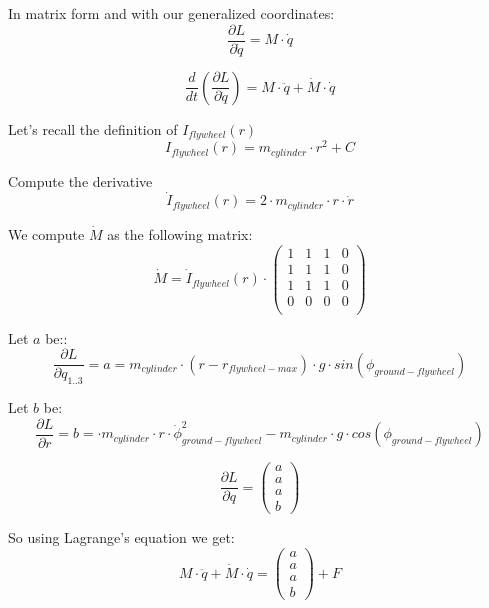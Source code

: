 In matrix form and with our generalized coordinates:
\begin{equation}
	\frac{\partial L}{\partial \dot{q}} =
	M \cdot \dot{q}
\end{equation}

\begin{equation}
	\frac{d}{dt}(\frac{\partial L}{\partial \dot{q}}) =
	M \cdot \ddot{q} + \dot{M} \cdot \dot{q}
\end{equation}

Let's recall the definition of $I_{flywheel}(r)$
\begin{equation}
	I_{flywheel}(r)= m_{cylinder} \cdot r^2 + C
\end{equation}


Compute the derivative
\begin{equation}
	\dot{I}_{flywheel}(r)= 2 \cdot m_{cylinder} \cdot r \cdot \dot{r}
\end{equation}

We compute $\dot{M}$ as the following matrix:
\begin{equation}
	\dot{M}=
	\dot{I}_{flywheel}(r) \cdot
	\begin{pmatrix}
		1 &
		1 &
		1 &
		0   \\
		1 &
		1 &
		1 &
		0   \\
		1 &
		1 &
		1 &
		0   \\
		0 &
		0 &
		0 &
		0   \\
	\end{pmatrix}
\end{equation}

Let $a$ be::
\begin{equation}
	\frac{\partial L}{\partial q_{1..3}} = a = m_{cylinder}\cdot (r-r_{flywheel-max}) \cdot g \cdot sin(\phi_{ground-flywheel})
\end{equation}

Let $b$ be:
\begin{equation}
	\frac{\partial L}{\partial r} = b = \cdot m_{cylinder} \cdot r  \cdot \dot{\phi}_{ground-flywheel}^2  - m_{cylinder}\cdot g \cdot cos(\phi_{ground-flywheel})
\end{equation}

\begin{equation}
	\frac{\partial L}{\partial q} = \begin{pmatrix}
		a \\ a \\ a \\ b
	\end{pmatrix}
\end{equation}

So using Lagrange's equation we get:
\begin{equation}
	\boxed{
		M \cdot \ddot{q} + \dot{M} \cdot \dot{q}=
		\begin{pmatrix}
			a \\ a \\ a \\ b
		\end{pmatrix}
		+ F
	}
\end{equation}
